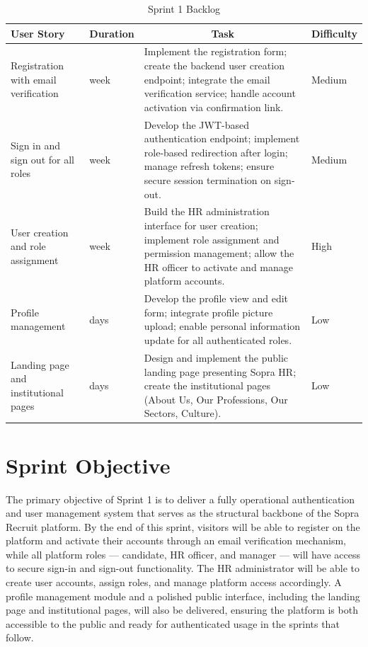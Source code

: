 \setlength{\tabcolsep}{4pt}
\renewcommand{\arraystretch}{1.5}
\begin{table}[H]
\centering
\small
\begin{tabularx}{\textwidth}{|>{\centering\arraybackslash}p{3.2cm}|>{\centering\arraybackslash}p{1.6cm}|X|>{\centering\arraybackslash}p{1.8cm}|}
\hline
\rowcolor{headerblue}
\textbf{User Story} & \textbf{Duration} & \multicolumn{1}{c|}{\textbf{Task}} & \textbf{Difficulty} \\
\hline
Registration with email verification
  & 1 week
  & Implement the registration form; create the backend user creation endpoint; integrate the email verification service; handle account activation via confirmation link.
  & Medium \\
\hline
Sign in and sign out for all roles
  & 1 week
  & Develop the JWT-based authentication endpoint; implement role-based redirection after login; manage refresh tokens; ensure secure session termination on sign-out.
  & Medium \\
\hline
User creation and role assignment
  & 1 week
  & Build the HR administration interface for user creation; implement role assignment and permission management; allow the HR officer to activate and manage platform accounts.
  & High \\
\hline
Profile management
  & 3 days
  & Develop the profile view and edit form; integrate profile picture upload; enable personal information update for all authenticated roles.
  & Low \\
\hline
Landing page and institutional pages
  & 4 days
  & Design and implement the public landing page presenting Sopra HR; create the institutional pages (About Us, Our Professions, Our Sectors, Culture).
  & Low \\
\hline
\end{tabularx}
\caption{Sprint 1 Backlog}
\label{tab:sprint1backlog}
\end{table}
\normalsize
\setlength{\tabcolsep}{6pt}
\renewcommand{\arraystretch}{1}

\section{Sprint Objective}

The primary objective of Sprint 1 is to deliver a fully operational authentication and user management system that serves as the structural backbone of the Sopra Recruit platform. By the end of this sprint, visitors will be able to register on the platform and activate their accounts through an email verification mechanism, while all platform roles — candidate, HR officer, and manager — will have access to secure sign-in and sign-out functionality. The HR administrator will be able to create user accounts, assign roles, and manage platform access accordingly. A profile management module and a polished public interface, including the landing page and institutional pages, will also be delivered, ensuring the platform is both accessible to the public and ready for authenticated usage in the sprints that follow.

